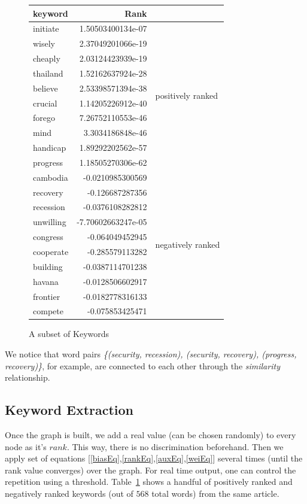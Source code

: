 \documentclass[a4paper]{report}
\begin{document}
\begin{figure}
\begin{floatrow}
{\begin{tabular}{l r l}
\toprule
keyword & Rank&\\
\midrule
initiate & 1.50503400134e-07&\multirow{10}{20pt}{positively ranked}\\
wisely & 2.37049201066e-19\\
cheaply & 2.03124423939e-19\\
thailand &1.52162637924e-28\\
believe & 2.53398571394e-38\\
crucial & 1.14205226912e-40\\
forego & 7.26752110553e-46\\
mind & 3.3034186848e-46\\
handicap & 1.89292202562e-57\\
progress & 1.18505270306e-62\\
\midrule
cambodia & -0.0210985300569 &\multirow{10}{50pt}{negatively ranked}\\
recovery & -0.126687287356 \\
recession & -0.0376108282812 \\
unwilling & -7.70602663247e-05\\ 
congress & -0.064049452945 \\
cooperate & -0.285579113282\\
building & -0.0387114701238\\
havana & -0.0128506602917\\ 
frontier & -0.0182778316133\\ 
compete & -0.075853425471\\
\bottomrule
\end{tabular}
}
{\caption{A subset of Keywords}\label{finalKeys}
}
\end{floatrow}
\end{figure}
We notice that word pairs {\em \{(security, recession), (security, recovery), (progress, recovery)\}}, for example, are connected to each other through the {\em similarity} relationship.
\subsection{Keyword Extraction}
\par Once the graph is built, we add a real value (can be chosen randomly) 
to every node as it's $rank$. This way, there is no discrimination
beforehand. Then we apply set of equations [\ref{biasEq},\ref{rankEq},\ref{auxEq},\ref{weiEq}] several times (until the
rank value converges) over the graph. For real time output, one can control
the repetition using a threshold. 
Table~\ref{finalKeys} shows a handful of positively ranked and negatively ranked keywords (out of $568$ total words) from the same article. 
\end{document}

